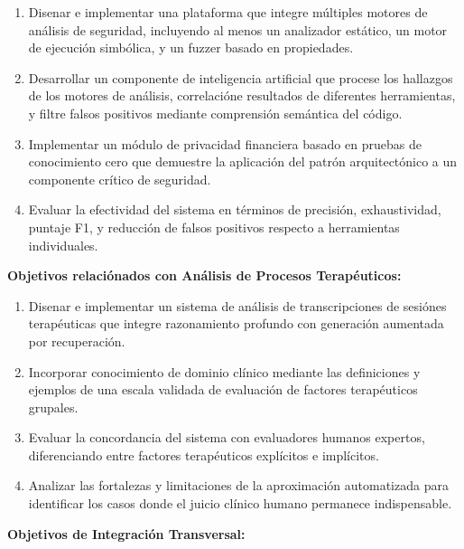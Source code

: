 \documentclass[12pt,a4paper,twoside]{book}
\begin{document}
\begin{enumerate}[label=\textbf{OE2.\arabic*.}]
    \item Disenar e implementar una plataforma que integre múltiples motores de análisis de seguridad, incluyendo al menos un analizador estático, un motor de ejecución simbólica, y un fuzzer basado en propiedades.
    
    \item Desarrollar un componente de inteligencia artificial que procese los hallazgos de los motores de análisis, correlacióne resultados de diferentes herramientas, y filtre falsos positivos mediante comprensión semántica del código.
    
    \item Implementar un módulo de privacidad financiera basado en pruebas de conocimiento cero que demuestre la aplicación del patrón arquitectónico a un componente crítico de seguridad.
    
    \item Evaluar la efectividad del sistema en términos de precisión, exhaustividad, puntaje F1, y reducción de falsos positivos respecto a herramientas individuales.
\end{enumerate}

\textbf{Objetivos relaciónados con Análisis de Procesos Terapéuticos:}

\begin{enumerate}[label=\textbf{OE3.\arabic*.}]
    \item Disenar e implementar un sistema de análisis de transcripciones de sesiónes terapéuticas que integre razonamiento profundo con generación aumentada por recuperación.
    
    \item Incorporar conocimiento de dominio clínico mediante las definiciones y ejemplos de una escala validada de evaluación de factores terapéuticos grupales.
    
    \item Evaluar la concordancia del sistema con evaluadores humanos expertos, diferenciando entre factores terapéuticos explícitos e implícitos.
    
    \item Analizar las fortalezas y limitaciones de la aproximación automatizada para identificar los casos donde el juicio clínico humano permanece indispensable.
\end{enumerate}

\textbf{Objetivos de Integración Transversal:}
\end{document}
